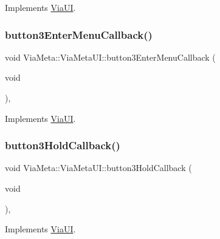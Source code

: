Implements \mbox{\hyperlink{class_via_u_i_a8fce17e375ea6fe3a4746bff3e6dec75}{Via\+UI}}.

\mbox{\label{class_via_meta_1_1_via_meta_u_i_abff70e527b92121c207699c8c8334ee6}} 
\subsubsection{\texorpdfstring{button3\+Enter\+Menu\+Callback()}{button3EnterMenuCallback()}}
{\footnotesize\ttfamily void Via\+Meta\+::\+Via\+Meta\+U\+I\+::button3\+Enter\+Menu\+Callback (\begin{DoxyParamCaption}\item[{void}]{ }\end{DoxyParamCaption})\hspace{0.3cm}{\ttfamily [override]}, {\ttfamily [virtual]}}



Implements \mbox{\hyperlink{class_via_u_i_a883081e46324dec82ad89f2e77cf4b65}{Via\+UI}}.

\mbox{\label{class_via_meta_1_1_via_meta_u_i_a124e9edd67310235839dae92aa4bb9a9}} 
\subsubsection{\texorpdfstring{button3\+Hold\+Callback()}{button3HoldCallback()}}
{\footnotesize\ttfamily void Via\+Meta\+::\+Via\+Meta\+U\+I\+::button3\+Hold\+Callback (\begin{DoxyParamCaption}\item[{void}]{ }\end{DoxyParamCaption})\hspace{0.3cm}{\ttfamily [override]}, {\ttfamily [virtual]}}



Implements \mbox{\hyperlink{class_via_u_i_a7334aea36cf78afac284dd5e899e8ace}{Via\+UI}}.

